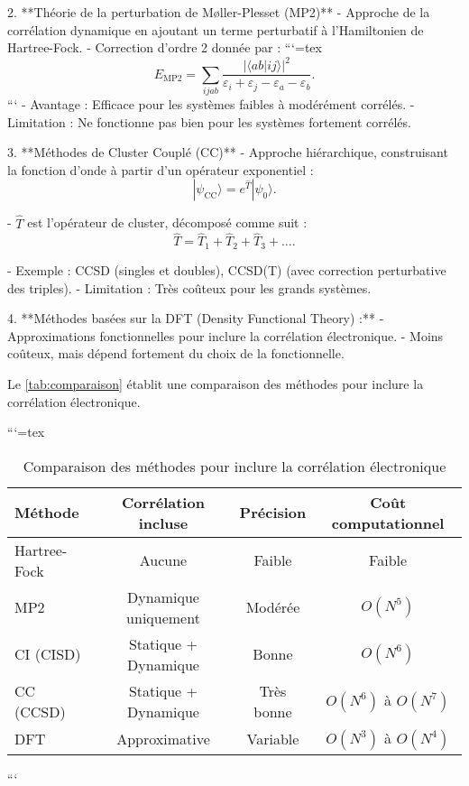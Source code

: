 \documentclass[12pt,a4paper]{report}
\begin{document}
\begin{markdown}
2. **Théorie de la perturbation de Møller-Plesset (MP2)**
   - Approche de la corrélation dynamique en ajoutant un terme perturbatif à l'Hamiltonien de Hartree-Fock.
   - Correction d'ordre 2 donnée par :
```{=tex}
\begin{equation}
E_{\text{MP2}} = \sum_{ijab} \frac{|\langle ab | ij \rangle|^2}{\varepsilon_i + \varepsilon_j - \varepsilon_a - \varepsilon_b} .
\end{equation}
```
   - Avantage : Efficace pour les systèmes faibles à modérément corrélés.
   - Limitation : Ne fonctionne pas bien pour les systèmes fortement corrélés.

3. **Méthodes de Cluster Couplé (CC)**
   - Approche hiérarchique, construisant la fonction d’onde à partir d’un opérateur exponentiel :
\begin{equation}
|\psi_{\text{CC}}\rangle = e^{\hat{T}} |\psi_0\rangle .
\end{equation}

   - $\hat{T}$ est l’opérateur de cluster, décomposé comme suit :
\begin{equation}
\hat{T} = \hat{T}_1 + \hat{T}_2 + \hat{T}_3 + \dots .
\end{equation}

   - Exemple : CCSD (singles et doubles), CCSD(T) (avec correction perturbative des triples).
   - Limitation : Très coûteux pour les grands systèmes.

4. **Méthodes basées sur la DFT (Density Functional Theory) :**
   - Approximations fonctionnelles pour inclure la corrélation électronique.
   - Moins coûteux, mais dépend fortement du choix de la fonctionnelle.

Le \autoref{tab:comparaison} établit une comparaison des méthodes pour inclure la corrélation électronique.

```{=tex}
\begin{table}[h!]
\centering
\caption{Comparaison des méthodes pour inclure la corrélation électronique}
\begin{tabular}{@{}lccc@{}}
\toprule
\textbf{Méthode}       & \textbf{Corrélation incluse} & \textbf{Précision}  & \textbf{Coût computationnel} \\ \midrule
Hartree-Fock           & Aucune                      & Faible              & Faible                       \\
MP2                    & Dynamique uniquement        & Modérée             & $O(N^5)$                     \\
CI (CISD)              & Statique + Dynamique        & Bonne               & $O(N^6)$                     \\
CC (CCSD)              & Statique + Dynamique        & Très bonne          & $O(N^6)$ à $O(N^7)$          \\
DFT                    & Approximative               & Variable            & $O(N^3)$ à $O(N^4)$          \\ \bottomrule
\end{tabular}
\label{tab:comparaison}
\end{table}
```


\end{markdown}
\end{document}
